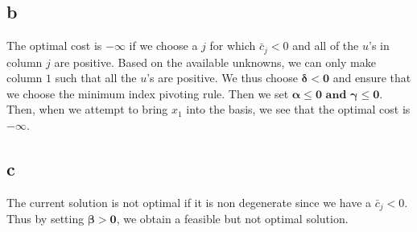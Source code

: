 \subsection*{b}
The optimal cost is $- \infty$ if we choose a $j$ for which $\bar{c}_j < 0$ and all of the $u$'s in column $j$ are positive. Based on the available unknowns, we can only make column $1$ such that all the $u$'s are positive. We thus choose $\boldsymbol{\delta < 0}$ and ensure that we choose the minimum index pivoting rule. Then we set $\boldsymbol{\alpha \le 0 \text{ and } \gamma \le 0}$. Then, when we attempt to bring $x_1$ into the basis, we see that the optimal cost is $- \infty$.

\subsection*{c}
The current solution is not optimal if it is non degenerate since we have a $\bar{c}_j < 0$. Thus by setting $\boldsymbol{\beta > 0}$, we obtain a feasible but not optimal solution.